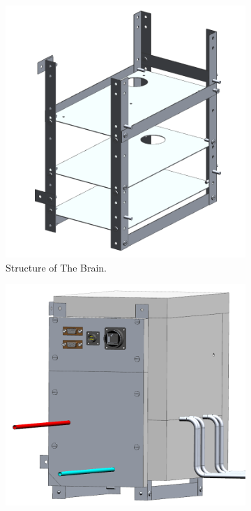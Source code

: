 \documentclass[a4paper,12pt,twoside]{article}
\providecommand{\DIFaddtex}[1]{{\protect\color{blue}\uwave{#1}}} %
\providecommand{\DIFaddFL}[1]{\DIFadd{#1}} %
\providecommand{\DIFaddbeginFL}{} %
\providecommand{\DIFaddendFL}{} %
\providecommand{\DIFdelbeginFL}{} %
\providecommand{\DIFdelendFL}{} %
\providecommand{\DIFadd}[1]{\texorpdfstring{\DIFaddtex{#1}}{#1}} %
\newcommand{\DIFscaledelfig}{0.5}
\newlength{\DIFdelgraphicswidth} %
\newlength{\DIFdelgraphicsheight} %
\newcommand{\DIFaddincludegraphics}[2][]{{\color{blue}\fbox{\DIFOincludegraphics[#1]{#2}}}} %
\newcommand{\DIFdelincludegraphics}[2][]{%
\sbox{\DIFdelgraphicsbox}{\DIFOincludegraphics[#1]{#2}}%
\settoboxwidth{\DIFdelgraphicswidth}{\DIFdelgraphicsbox} %
\settoboxtotalheight{\DIFdelgraphicsheight}{\DIFdelgraphicsbox} %
\scalebox{\DIFscaledelfig}{%
\parbox[b]{\DIFdelgraphicswidth}{\usebox{\DIFdelgraphicsbox}\\[-\baselineskip] \rule{\DIFdelgraphicswidth}{0em}}\llap{\resizebox{\DIFdelgraphicswidth}{\DIFdelgraphicsheight}{%
\setlength{\unitlength}{\DIFdelgraphicswidth}%
\begin{picture}(1,1)%
\thicklines\linethickness{2pt} %
{\color[rgb]{1,0,0}\put(0,0){\framebox(1,1){}}}%
{\color[rgb]{1,0,0}\put(0,0){\line( 1,1){1}}}%
{\color[rgb]{1,0,0}\put(0,1){\line(1,-1){1}}}%
\end{picture}%
}\hspace*{3pt}}} %
} %
\DeclareRobustCommand{\DIFaddbeginFL}{\DIFOaddbeginFL \let\includegraphics\DIFaddincludegraphics} %
\DeclareRobustCommand{\DIFaddendFL}{\DIFOaddendFL \let\includegraphics\DIFOincludegraphics} %
\DeclareRobustCommand{\DIFdelbeginFL}{\DIFOdelbeginFL \let\includegraphics\DIFdelincludegraphics} %
\DeclareRobustCommand{\DIFdelendFL}{\DIFOaddendFL \let\includegraphics\DIFOincludegraphics} %
\begin{document}
\begin{figure}[H]
    \centering
    \DIFdelbeginFL %
\DIFdelendFL \DIFaddbeginFL \begin{subfigure}[b]{0.48\textwidth}
    \centering
    \includegraphics[width=\textwidth]{4-experiment-design/img/Mechanical/Brain_Structure.png}
    \DIFaddendFL \caption{Structure of The Brain.}
    \label{brain_structure}
    \DIFaddbeginFL \end{subfigure}
    \DIFaddFL{~
    }\begin{subfigure}[b]{0.48\textwidth}
    \centering
    \includegraphics[width=\textwidth]{4-experiment-design/img/Mechanical/Brain_Isometric.png}

\end{subfigure}
\end{figure}
\end{document}
